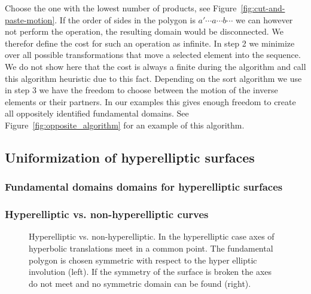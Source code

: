 \documentclass[Thesis.tex]{subfiles}
\begin{document}
Choose the one with the lowest number of products, see Figure~\ref{fig:cut-and-paste-motion}. If the order of sides in the polygon is $a' \cdots a \cdots b \cdots$ we can however not perform the operation, the resulting domain would be disconnected. We therefor define the cost for such an operation as infinite. In step 2 we minimize over all possible transformations that move a selected element into the sequence. We do not show here that the cost is always a finite during the algorithm and call this algorithm heuristic due to this fact. Depending on the sort algorithm we use in step 3 we have the freedom to choose between the motion of the inverse elements or their partners. In our examples this gives enough freedom to create all oppositely identified fundamental domains. See Figure~\ref{fig:opposite_algorithm} for an example of this algorithm.



\subsection{Uniformization of hyperelliptic surfaces}
\label{sec:hyperelliptic}



\subsubsection{Fundamental domains domains for hyperelliptic surfaces}
\label{sec:hyperelliptic_domain}


\subsubsection{Hyperelliptic vs. non-hyperelliptic curves}
\label{sec:non-hyperelliptic}

\begin{figure}
\centering
{}
\caption{Hyperelliptic vs. non-hyperelliptic. In the hyperelliptic case axes of hyperbolic translations meet in a common point. The fundamental polygon is chosen symmetric with respect to the hyper elliptic involution (left). If the symmetry of the surface is broken the axes do not meet and no symmetric domain can be found (right).}
\label{fig:non-hyperelliptic}
\end{figure}
\end{document}
